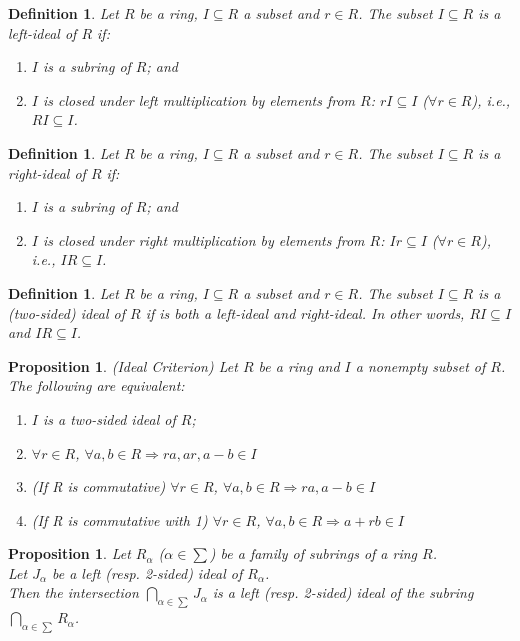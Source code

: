 \documentclass[a4paper,8pt]{article}
\newcommand{\hlt}[1]{\textit{{\color{blue}#1}}}
\theoremstyle{theorem}
\newtheorem{proposition}[theorem]{Proposition}
\newtheorem{definition}[theorem]{Definition}
\begin{document}
\begin{definition}
Let $R$ be a ring, $I \subseteq R$ a subset and $r \in R$. The subset $I \subseteq R$ is a \hlt{left-ideal} of $R$ if:
\begin{enumerate}[label=(\roman*)]
\item $I$ is a subring of $R$; and
\item $I$ is closed under left multiplication by elements from $R$: $rI \subseteq I$ ($\forall r \in R$), i.e., $RI \subseteq I$.
\end{enumerate}
\end{definition}


\begin{definition}
Let $R$ be a ring, $I \subseteq R$ a subset and $r \in R$. The subset $I \subseteq R$ is a \hlt{right-ideal} of $R$ if:
\begin{enumerate}[label=(\roman*)]
\item $I$ is a subring of $R$; and
\item $I$ is closed under right multiplication by elements from $R$: $Ir \subseteq I$ ($\forall r \in R$), i.e., $IR \subseteq I$.
\end{enumerate}
\end{definition}


\begin{definition}
Let $R$ be a ring, $I \subseteq R$ a subset and $r \in R$. The subset $I \subseteq R$ is a \hlt{(two-sided) ideal} of $R$ if is both a left-ideal and right-ideal. In other words, $RI \subseteq I$ and $IR \subseteq I$.
\end{definition}


\begin{proposition}
\hlt{(Ideal Criterion)} Let $R$ be a ring and $I$ a nonempty subset of $R$.\\
The following are equivalent:
\begin{enumerate}[label=(\roman*)]
\item $I$ is a two-sided ideal of $R$;
\item $\forall r \in R$, $\forall a, b \in R \Rightarrow ra, ar, a-b \in I$
\item (If R is commutative) $\forall r \in R$, $\forall a, b \in R \Rightarrow ra, a-b \in I$
\item (If R is commutative with 1) $\forall r \in R$, $\forall a, b \in R \Rightarrow a+rb \in I$
\end{enumerate}
\end{proposition}


\begin{proposition}
Let $R_\alpha$ ($\alpha \in \sum$) be a family of subrings of a ring $R$.\\
Let $J_\alpha$ be a left (resp. 2-sided) ideal of $R_\alpha$.\\
Then the intersection $\bigcap\limits_{\alpha \in \sum}J_\alpha$ is a left (resp. 2-sided) ideal of the subring $\bigcap\limits_{\alpha \in \sum}R_\alpha$.\\
\end{proposition}
\end{document}
